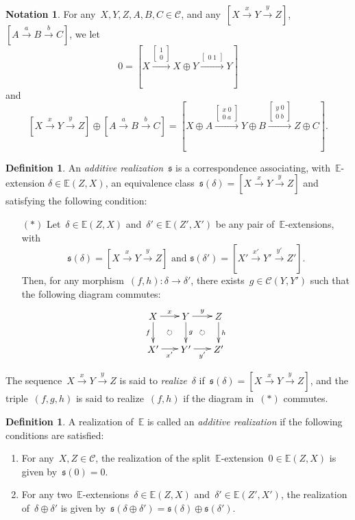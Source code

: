 \documentclass{amsart}
\theoremstyle{definition}
\newtheorem{definition}[theorem]{Definition}
\newtheorem{notation}[theorem]{Notation}
\newcommand{\darkblue}{\color{darkblue}} %
\newcommand{\defn}[1]{\textsl{\darkblue #1}} %
\newcommand{\cat}{\mathcal{C}}
\newcommand{\bsm}{\begin{smallmatrix}}
\newcommand{\esm}{\end{smallmatrix}}
\begin{document}
\begin{notation}
For any~$X,Y,Z,A,B,C\in\cat$, and any~$[X \xrightarrow{x} Y \xrightarrow{y} Z]$,~$[A \xrightarrow{a} B \xrightarrow{b} C]$, we let
\[ 0=[X\overset{\left[\bsm1\\0\esm\right]}{\longrightarrow} X\oplus Y \overset{\left[\bsm0\;1\esm\right]}{\longrightarrow} Y]
\]
and
\[
[X \xrightarrow{x} Y \xrightarrow{y} Z]\oplus [A \xrightarrow{a} B \xrightarrow{b} C] = [X\oplus A \overset{\left[\bsm x \; 0 \\ 0\; a\esm\right]}{\longrightarrow} Y\oplus B \overset{\left[\bsm y\;0\\0\;b \esm\right]}{\longrightarrow} Z\oplus C].
\]
\end{notation}

\begin{definition}
An \defn{additive realization}~$\mathfrak{s}$ is a correspondence associating, with~$\mathbb{E}$-extension ${\delta\in\mathbb{E}(Z,X)}$, an equivalence class~$\mathfrak{s}(\delta)=[X\xrightarrow{x}Y\xrightarrow{y}Z]$ and satisfying the following condition: 
\begin{itemize}
\item[$(\ast)$] Let~$\delta\in\mathbb{E}(Z,X)$ and~$\delta'\in\mathbb{E}(Z',X')$ be any pair of~$\mathbb{E}$-extensions, with
\[\mathfrak{s}(\delta)=[X\xrightarrow{x}Y\xrightarrow{y}Z] \text{ and } \mathfrak{s}(\delta')=[X'\xrightarrow{x'}Y'\xrightarrow{y'}Z'].\]
Then, for any morphism~$(f,h):\delta\to\delta'$, there exists~$g\in\cat(Y,Y')$ such that the following diagram commutes:
\[
\xy
(-12,6)*+{X}="0";
(0,6)*+{Y}="2";
(12,6)*+{Z}="4";
%
(-12,-6)*+{X'}="10";
(0,-6)*+{Y'}="12";
(12,-6)*+{Z'}="14";
%
{\ar^{x} "0";"2"};
{\ar^{y} "2";"4"};
%
{\ar_{f} "0";"10"};
{\ar^{g} "2";"12"};
{\ar^{h} "4";"14"};
%
{\ar_{x'} "10";"12"};
{\ar_{y'} "12";"14"};
%
{\ar@{}|{} "0";"12"};
{\ar@{}|{} "2";"14"};
%
{\ar@{}|\circlearrowright "0";"12"};
{\ar@{}|\circlearrowright "2";"14"};
\endxy
\]
\end{itemize}

The sequence~$X\xrightarrow{x}Y\xrightarrow{y}Z$ is said to \defn{realize}~$\delta$ if~$\mathfrak{s}(\delta)=[X\xrightarrow{x}Y\xrightarrow{y}Z]$, and the triple~$(f,g,h)$ is said to realize~$(f,h)$ if the diagram in~$(\ast)$ commutes.
\end{definition}


\begin{definition}
A realization of~$\mathbb{E}$ is called an \defn{additive realization} if the following conditions are satisfied:
\begin{enumerate}
\item For any~$X,Z\in\cat$, the realization of the split~$\mathbb{E}$-extension~$0\in\mathbb{E}(Z,X)$ is given by~$\mathfrak{s}(0)=0$.
\item For any two~$\mathbb{E}$-extensions~$\delta\in\mathbb{E}(Z,X)$ and~$\delta'\in\mathbb{E}(Z',X')$, the realization of~$\delta\oplus\delta'$ is given by~$\mathfrak{s}(\delta\oplus\delta')=\mathfrak{s}(\delta)\oplus\mathfrak{s}(\delta')$.
\end{enumerate}
\end{definition}
\end{document}
